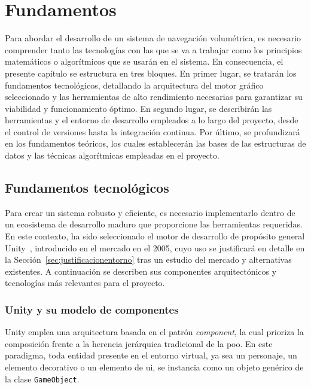 \chapter{Fundamentos}

Para abordar el desarrollo de un sistema de navegación volumétrica, es necesario comprender tanto las tecnologías con las que se va a trabajar como los principios matemáticos o algorítmicos que se usarán en el sistema.
En consecuencia, el presente capítulo se estructura en tres bloques.
En primer lugar, se tratarán los fundamentos tecnológicos, detallando la arquitectura del motor gráfico seleccionado y las herramientas de alto rendimiento necesarias para garantizar su viabilidad y funcionamiento óptimo.
En segundo lugar, se describirán las herramientas y el entorno de desarrollo empleados a lo largo del proyecto, desde el control de versiones hasta la integración continua.
Por último, se profundizará en los fundamentos teóricos, los cuales establecerán las bases de las estructuras de datos y las técnicas algorítmicas empleadas en el proyecto.

\section{Fundamentos tecnológicos}

Para crear un sistema robusto y eficiente, es necesario implementarlo dentro de un ecosistema de desarrollo maduro que proporcione las herramientas requeridas.
En este contexto, ha sido seleccionado el motor de desarrollo de propósito general Unity~\cite{unity}, introducido en el mercado en el 2005, cuyo uso se justificará en detalle en la Sección~\ref{sec:justificacionentorno} tras un estudio del mercado y alternativas existentes.
A continuación se describen sus componentes arquitectónicos y tecnologías más relevantes para el proyecto.

\subsection{Unity y su modelo de componentes}

Unity emplea una arquitectura basada en el patrón \textit{component}, la cual prioriza la composición frente a la herencia jerárquica tradicional de la \acrfull{poo}.
En este paradigma, toda entidad presente en el entorno virtual, ya sea un personaje, un elemento decorativo o un elemento de \acrfull{ui}, se instancia como un objeto genérico de la clase \texttt{GameObject}.

